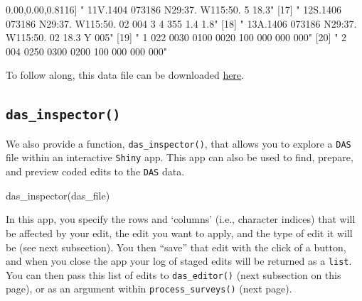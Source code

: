\documentclass[
]{book}
\newenvironment{Shaded}{\begin{snugshade}}{\end{snugshade}}
\newcommand{\DecValTok}[1]{\textcolor[rgb]{0.00,0.00,0.81}{#1}}
\newcommand{\FunctionTok}[1]{\textcolor[rgb]{0.00,0.00,0.00}{#1}}
\newcommand{\NormalTok}[1]{#1}
\newcommand{\StringTok}[1]{\textcolor[rgb]{0.31,0.60,0.02}{#1}}
\begin{document}
\begin{Shaded}
\begin{Highlighting}[]
\NormalTok{[}\DecValTok{16}\NormalTok{] }\StringTok{" 11V.1404   073186 N29:37.   W115:50.      5           18.3"}                    
\NormalTok{[}\DecValTok{17}\NormalTok{] }\StringTok{" 12S.1406   073186 N29:37.   W115:50.     02  004    3    4  355  1.4  1.8"}     
\NormalTok{[}\DecValTok{18}\NormalTok{] }\StringTok{" 13A.1406   073186 N29:37.   W115:50.     02 18.3         Y  005"}               
\NormalTok{[}\DecValTok{19}\NormalTok{] }\StringTok{"   1                                     022 0030 0100 0020  100  000  000  000"}
\NormalTok{[}\DecValTok{20}\NormalTok{] }\StringTok{"   2                                     004 0250 0300 0200  100  000  000  000"}
\end{Highlighting}
\end{Shaded}

To follow along, this data file can be downloaded \href{https://raw.githubusercontent.com/emk-noaa/LTAvignette/main/data/surveys/CenPac1986-2020_Final_alb.das?token=GHSAT0AAAAAACFPESQVLR7DOE4I3UD4UJ2YZGRILEQ}{here}.

\hypertarget{das_inspector}{%
\subsection*{\texorpdfstring{\texttt{das\_inspector()}}{das\_inspector()}}\label{das_inspector}}

We also provide a function, \texttt{das\_inspector()}, that allows you to explore a \texttt{DAS} file within an interactive \texttt{Shiny} app. This app can also be used to find, prepare, and preview coded edits to the \texttt{DAS} data.

\begin{Shaded}
\begin{Highlighting}[]
\FunctionTok{das\_inspector}\NormalTok{(das\_file)}
\end{Highlighting}
\end{Shaded}

In this app, you specify the rows and `columns' (i.e., character indices) that will be affected by your edit, the edit you want to apply, and the type of edit it will be (see next subsection). You then ``save'' that edit with the click of a button, and when you close the app your log of staged edits will be returned as a \texttt{list}. You can then pass this list of edits to \texttt{das\_editor()} (next subsection on this page), or as an argument within \texttt{process\_surveys()} (next page).
\end{document}

